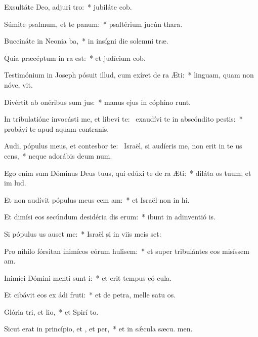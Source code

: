 \item Exsultáte Deo, adjuri tro:~* jubiláte  cob.
\item Súmite psalmum, et te panum:~* psaltérium jucún  thara.
\item Buccináte in Neonia ba,~* in insígni die solemni træ.
\item Quia præcéptum in ra est:~* et judícium  cob.
\item Testimónium in Joseph pósuit illud, cum exíret de ra Æti:~* linguam, quam non nóve, vit.
\item Divértit ab onéribus sum jus:~* manus ejus in cóphino runt.
\item In tribulatióne invocásti me, et libevi te:~\pscross{} exaudívi te in abscóndito pestis:~* probávi te apud aquam contranis.
\item Audi, pópulus meus, et contesbor te:~\pscross{} Israël, si audíeris me, non erit in te us cens,~* neque adorábis deum num.
\item Ego enim sum Dóminus Deus tuus, qui edúxi te de ra Æti:~* diláta os tuum, et im lud.
\item Et non audívit pópulus meus cem am:~* et Israël non in hi.
\item Et dimísi eos secúndum desidéria dis erum:~* ibunt in adinventió is.
\item Si pópulus us auset me:~* Israël si in viis meis set:
\item Pro níhilo fórsitan inimícos eórum hulisem:~* et super tribulántes eos misíssem  am.
\item Inimíci Dómini menti sunt i:~* et erit tempus eó  cula.
\item Et cibávit eos ex ádi fruti:~* et de petra, melle satu os.
\item Glória tri, et lio,~* et Spirí to.
\item Sicut erat in princípio, et , et per,~* et in sǽcula sæcu. men.
